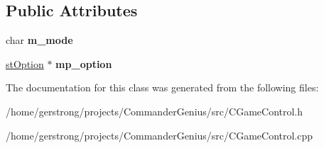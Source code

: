 \subsection*{Public Attributes}
\begin{DoxyCompactItemize}
\item 
\hypertarget{class_c_game_control_ab7c2fdf44ed6f2696f2df35b8a92db48}{
char {\bfseries m\_\-mode}}
\label{class_c_game_control_ab7c2fdf44ed6f2696f2df35b8a92db48}

\item 
\hypertarget{class_c_game_control_a6f7e9fd0cd58a2a54dfe3224074edae0}{
\hyperlink{structst_option}{stOption} $\ast$ {\bfseries mp\_\-option}}
\label{class_c_game_control_a6f7e9fd0cd58a2a54dfe3224074edae0}

\end{DoxyCompactItemize}


The documentation for this class was generated from the following files:\begin{DoxyCompactItemize}
\item 
/home/gerstrong/projects/CommanderGenius/src/CGameControl.h\item 
/home/gerstrong/projects/CommanderGenius/src/CGameControl.cpp\end{DoxyCompactItemize}
